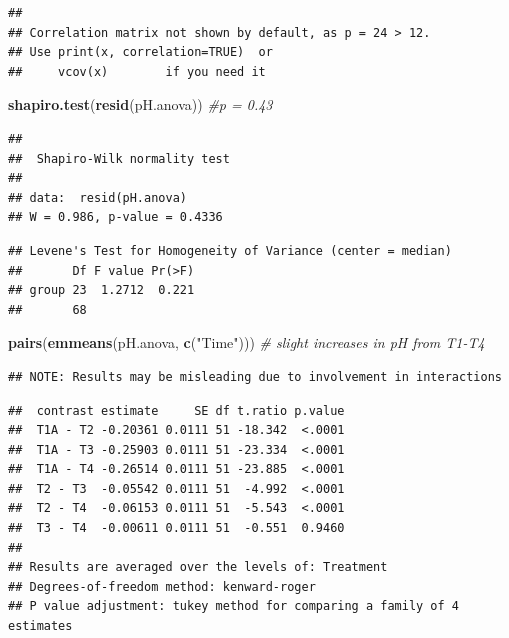 \documentclass[
]{article}
\newenvironment{Shaded}{\begin{snugshade}}{\end{snugshade}}
\newcommand{\CommentTok}[1]{\textcolor[rgb]{0.56,0.35,0.01}{\textit{#1}}}
\newcommand{\FunctionTok}[1]{\textcolor[rgb]{0.13,0.29,0.53}{\textbf{#1}}}
\newcommand{\NormalTok}[1]{#1}
\newcommand{\SpecialCharTok}[1]{\textcolor[rgb]{0.81,0.36,0.00}{\textbf{#1}}}
\newcommand{\StringTok}[1]{\textcolor[rgb]{0.31,0.60,0.02}{#1}}
\begin{document}
\begin{verbatim}
## 
## Correlation matrix not shown by default, as p = 24 > 12.
## Use print(x, correlation=TRUE)  or
##     vcov(x)        if you need it
\end{verbatim}

\begin{Shaded}
\begin{Highlighting}[]
\FunctionTok{shapiro.test}\NormalTok{(}\FunctionTok{resid}\NormalTok{(pH.anova)) }\CommentTok{\#p = 0.43}
\end{Highlighting}
\end{Shaded}

\begin{verbatim}
## 
##  Shapiro-Wilk normality test
## 
## data:  resid(pH.anova)
## W = 0.986, p-value = 0.4336
\end{verbatim}

\begin{Shaded}
\end{Shaded}

\begin{verbatim}
## Levene's Test for Homogeneity of Variance (center = median)
##       Df F value Pr(>F)
## group 23  1.2712  0.221
##       68
\end{verbatim}

\begin{Shaded}
\begin{Highlighting}[]
\FunctionTok{pairs}\NormalTok{(}\FunctionTok{emmeans}\NormalTok{(pH.anova, }\FunctionTok{c}\NormalTok{(}\StringTok{"Time"}\NormalTok{))) }\CommentTok{\# slight increases in pH from T1{-}T4}
\end{Highlighting}
\end{Shaded}

\begin{verbatim}
## NOTE: Results may be misleading due to involvement in interactions
\end{verbatim}

\begin{verbatim}
##  contrast estimate     SE df t.ratio p.value
##  T1A - T2 -0.20361 0.0111 51 -18.342  <.0001
##  T1A - T3 -0.25903 0.0111 51 -23.334  <.0001
##  T1A - T4 -0.26514 0.0111 51 -23.885  <.0001
##  T2 - T3  -0.05542 0.0111 51  -4.992  <.0001
##  T2 - T4  -0.06153 0.0111 51  -5.543  <.0001
##  T3 - T4  -0.00611 0.0111 51  -0.551  0.9460
## 
## Results are averaged over the levels of: Treatment 
## Degrees-of-freedom method: kenward-roger 
## P value adjustment: tukey method for comparing a family of 4 estimates
\end{verbatim}
\end{document}
